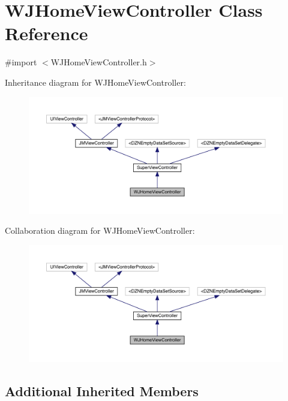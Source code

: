 \hypertarget{interface_w_j_home_view_controller}{}\section{W\+J\+Home\+View\+Controller Class Reference}
\label{interface_w_j_home_view_controller}


{\ttfamily \#import $<$W\+J\+Home\+View\+Controller.\+h$>$}



Inheritance diagram for W\+J\+Home\+View\+Controller\+:\nopagebreak
\begin{figure}[H]
\begin{center}
\leavevmode
\includegraphics[width=350pt]{interface_w_j_home_view_controller__inherit__graph}
\end{center}
\end{figure}


Collaboration diagram for W\+J\+Home\+View\+Controller\+:\nopagebreak
\begin{figure}[H]
\begin{center}
\leavevmode
\includegraphics[width=350pt]{interface_w_j_home_view_controller__coll__graph}
\end{center}
\end{figure}
\subsection*{Additional Inherited Members}


